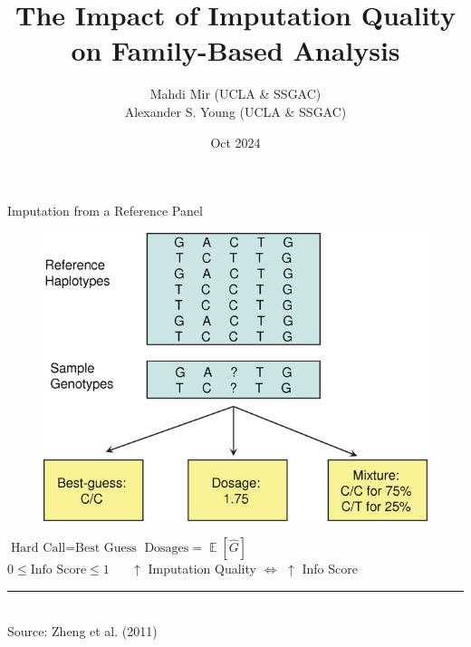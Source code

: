 \documentclass{beamer}
\title[]{The Impact of Imputation Quality on Family-Based Analysis}
\author[]{Mahdi Mir (UCLA \& SSGAC) \\ Alexander S. Young (UCLA \& SSGAC)}
\date[]{Oct 2024}
\DeclareMathOperator{\E}{\mathbb{E}}
\begin{document}
\maketitle


\begin{frame}{Imputation from a Reference Panel}



      \begin{figure}
            \centering
            \includegraphics[width= .63\textwidth]{fig/mfig001-2.jpg}
      \end{figure}
      \begin{center}
            \(\text{Hard Call}=\text{Best Guess}\) \hspace{25pt}  \(\text{Dosages}=\E[\hat{G}]\)
            \\
            \vspace{5pt}
            \(0 \leq \text{Info Score} \leq 1\) \(\quad\) \(\uparrow\) Imputation Quality \(\Longleftrightarrow\) \(\uparrow\) Info Score
      \end{center}
      \rule{0.3\linewidth}{0.4pt}
      \\
      \tiny{Source: Zheng et al. (2011)}


\end{frame}
\end{document}
